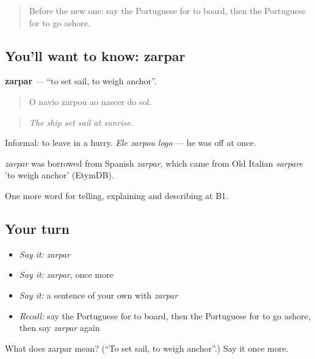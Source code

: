 \label{lesson:PT-C417-zarpar}



\begin{quote}
Before the new one: say the Portuguese for to board, then the Portuguese for to go ashore.
\end{quote}

\subsection*{You'll want to know: zarpar}
\textbf{zarpar} — \textquotedblleft{}to set sail, to weigh anchor\textquotedblright{}.

\begin{quote}
O navio zarpou ao nascer do sol.
\end{quote}

\begin{quote}
\emph{The ship set sail at sunrise.}
\end{quote}

Informal: to leave in a hurry. \emph{Ele zarpou logo} — he was off at once.

\begin{cousinweb}
\emph{zarpar} was borrowed from Spanish \emph{zarpar}, which came from Old Italian \emph{sarpare} 'to weigh anchor' (EtymDB).
\end{cousinweb}

\begin{grammarlens}[title={What you've built}]
One more word for telling, explaining and describing at B1.
\end{grammarlens}

\subsection*{Your turn}
\begin{itemize}
\raggedright
  \item \emph{Say it:} \emph{zarpar}
  \item \emph{Say it:} \emph{zarpar}, once more
  \item \emph{Say it:} a sentence of your own with \emph{zarpar}
  \item \emph{Recall:} say the Portuguese for to board, then the Portuguese for to go ashore, then say \emph{zarpar} again
\end{itemize}

\begin{tcolorbox}[breakable,colback=teal!4,colframe=teal!35!black,title={Before you move on}]
What does zarpar mean? (\textquotedblleft{}To set sail, to weigh anchor\textquotedblright{}.) Say it once more.
\end{tcolorbox}
